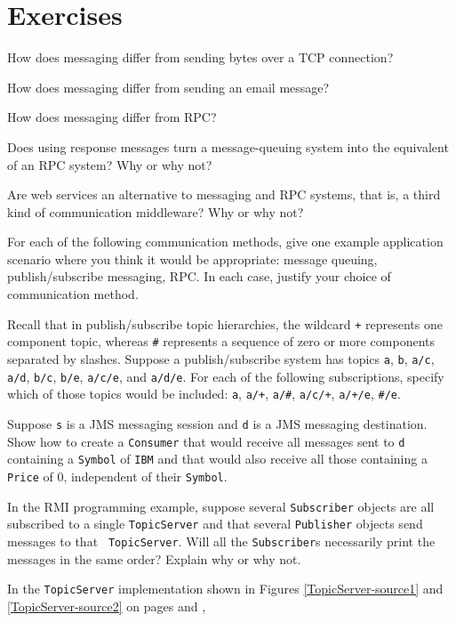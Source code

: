 \section*{Exercises}
\begin{chapterEnumerate}
\item
How does messaging differ from sending bytes over a TCP connection?
\item
How does messaging differ from sending an email message?
\item
How does messaging differ from RPC?
\item
Does using response messages turn a message-queuing system into the
equivalent of an RPC system?  Why or why not?
\item
Are web services an alternative to messaging and RPC systems, that is,
a third kind of communication middleware?  Why or why not?
\item
For each of the following communication methods, give one example
application scenario where you think it would be appropriate: message
queuing, publish/subscribe messaging, RPC.  In each case, justify your
choice of communication method.
\item
Recall that in publish/subscribe topic hierarchies, the wildcard
\verb|+| represents one component topic, whereas \verb|#| represents a
sequence of zero or more components separated by slashes.
Suppose a publish/subscribe system has topics \verb|a|, \verb|b|,
\verb|a/c|, \verb|a/d|, \verb|b/c|, \verb|b/e|,
\verb|a/c/e|, and \verb|a/d/e|.  For each of the
following subscriptions, specify which of those topics would be
included: \verb|a|, \verb|a/+|, \verb|a/#|, \verb|a/c/+|, \verb|a/+/e|, \verb|#/e|.
\item
Suppose \verb|s| is a JMS messaging session and \verb|d| is a JMS
messaging destination.  Show how to create a \verb|Consumer| that
would receive all
messages sent to \verb|d| containing a \verb|Symbol| of \verb|IBM| and that
would also receive all those containing a \verb|Price| of 0,
independent of their \verb|Symbol|.
\item
In the RMI programming example, suppose several {\tt Subscriber}
objects are all subscribed to a single {\tt TopicServer} and that
several {\tt Publisher} objects send messages to that {\tt
  TopicServer}.  Will all the {\tt Subscriber}s necessarily print the
messages in the same order?  Explain why or why not.
\item\label{BoundedBuffer-TopicServer-exercise}
In the {\tt TopicServer} implementation shown in
Figures \ref{TopicServer-source1} and \ref{TopicServer-source2} on pages \pageref{TopicServer-source1} and \pageref{TopicServer-source2},

\end{chapterEnumerate}
